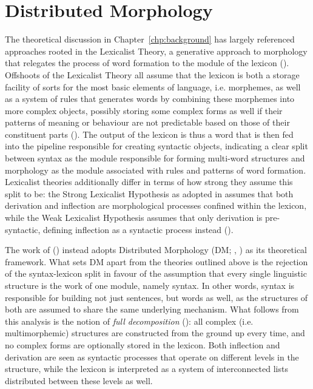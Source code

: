 \section{Distributed Morphology}
\label{sec:3-dm}
The theoretical discussion in Chapter~\ref{chp:background} has largely referenced approaches rooted in the Lexicalist Theory, a generative approach to morphology that relegates the process of word formation to the module of the lexicon (\cite{Schneider+2003}). Offshoots of the Lexicalist Theory all assume that the lexicon is both a storage facility of sorts for the most basic elements of language, i.e. morphemes, as well as a system of rules that generates words by combining these morphemes into more complex objects, possibly storing some complex forms as well if their patterns of meaning or behaviour are not predictable based on those of their constituent parts (\cite{Embick+2015}). The output of the lexicon is thus a word that is then fed into the pipeline responsible for creating syntactic objects, indicating a clear split between syntax as the module responsible for forming multi-word structures and morphology as the module associated with rules and patterns of word formation. Lexicalist theories additionally differ in terms of how strong they assume this split to be: the Strong Lexicalist Hypothesis as adopted in \citeauthor{Scalise+1986} assumes that both derivation and inflection are morphological processes confined within the lexicon, while the Weak Lexicalist Hypothesis assumes that only derivation is pre-syntactic, defining inflection as a syntactic process instead (\cite{Booij+2000}).

The work of \citeauthor{DeBelder+etal+2014} (\citeyear{DeBelder+etal+2014}) instead adopts Distributed Morphology (DM; \citeauthor{Halle+Marantz+1993} \citeyear{Halle+Marantz+1993}, \citeyear{Halle+Marantz+1994}) as its theoretical framework. What sets DM apart from the theories outlined above is the rejection of the syntax-lexicon split in favour of the assumption that every single linguistic structure is the work of one module, namely syntax. In other words, syntax is responsible for building not just sentences, but words as well, as the structures of both are assumed to share the same underlying mechanism. What follows from this analysis is the notion of \textit{full decomposition} (\cite{Embick+2015}): all complex (i.e. multimorphemic) structures are constructed from the ground up every time, and no complex forms are optionally stored in the lexicon. Both inflection and derivation are seen as syntactic processes that operate on different levels in the structure, while the lexicon is interpreted as a system of interconnected lists distributed between these levels as well.


